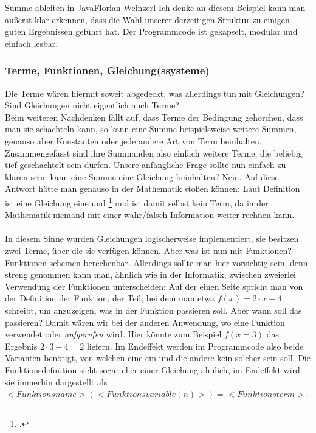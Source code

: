				{Summe ableiten in Java}{Florian Weinzerl}
\noindent
Ich denke an diesem Beispiel kann man äußerst klar erkennen, dass die Wahl unserer derzeitigen Struktur zu einigen guten Ergebnissen geführt hat. Der Programmcode ist gekapselt, modular und einfach lesbar.

\subsubsection{Terme, Funktionen, Gleichung(ssysteme)}
Die Terme wären hiermit soweit abgedeckt, was allerdings tun mit Gleichungen? Sind Gleichungen nicht eigentlich auch Terme?\\
Beim weiteren Nachdenken fällt auf, dass Terme der Bedingung gehorchen, dass man sie schachteln kann, so kann eine Summe beispielsweise weitere Summen, genauso aber Konstanten oder jede andere Art von Term beinhalten. Zusammengefasst sind ihre Summanden also einfach weitere Terme, die beliebig tief geschachtelt sein dürfen. Unsere anfängliche Frage sollte nun einfach zu klären sein: kann eine Summe eine Gleichung beinhalten? Nein. Auf diese Antwort hätte man genauso in der Mathematik stoßen können: Laut Definition ist eine Gleichung eine  und \footcite{math_gleichung} und ist damit selbst kein Term, da in der Mathematik niemand mit einer wahr/falsch-Information weiter rechnen kann.\\
\\
In diesem Sinne wurden Gleichungen logischerweise implementiert, sie besitzen zwei Terme, über die sie verfügen können. Aber was ist nun mit Funktionen? Funktionen scheinen berechenbar. Allerdings sollte man hier vorsichtig sein, denn streng genommen kann man, ähnlich wie in der Informatik, zwischen zweierlei Verwendung der Funktionen unterscheiden: Auf der einen Seite spricht man von der Definition der Funktion, der Teil, bei dem man etwa $f(x) = 2 \cdot x  - 4$ schreibt, um anzuzeigen, was in der Funktion passieren soll. Aber wann soll das passieren? Damit wären wir bei der anderen Anwendung, wo eine Funktion verwendet oder \textit{aufgerufen} wird. Hier könnte zum Beispiel $f(x=3)$ das Ergebnis $2 \cdot 3 - 4 = 2$ liefern. Im Endeffekt werden im Programmcode also beide Varianten benötigt, von welchen eine ein  und die andere kein solcher sein soll. Die Funktionsdefinition sieht sogar eher einer Gleichung ähnlich, im Endeffekt wird sie immerhin dargestellt als $<Funktionsname>(<Funktionsvariable(n)>)=<Funktionsterm>$.\\
